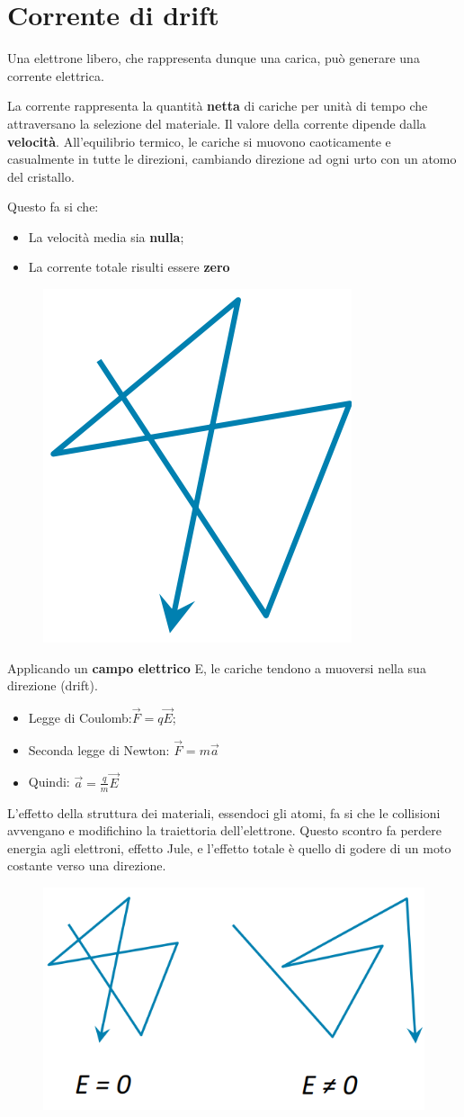 \newpage
\section{Corrente di drift}
Una elettrone libero, che rappresenta dunque una carica, può generare una corrente elettrica.

La corrente rappresenta la quantità \textbf{netta} di cariche per unità di tempo che attraversano la selezione del materiale. Il valore della corrente dipende dalla \textbf{velocità}. All'equilibrio termico, le cariche si muovono caoticamente e casualmente in tutte le direzioni, cambiando direzione ad ogni urto con un atomo del cristallo.

Questo fa si che:
\begin{itemize}
    \item La velocità media sia \textbf{nulla};
    \item La corrente totale risulti essere \textbf{zero}
\end{itemize}

\begin{figure}[htbp]
    \centering
    \includegraphics[width=0.14\linewidth]{img/moto-Casuale.png}    
\end{figure}


Applicando un \textbf{campo elettrico} E, le cariche tendono a muoversi nella sua direzione (drift).

\begin{itemize}
    \item Legge	di	Coulomb:\quad$\vec{F} = q\vec{E}$;
    \item Seconda	legge	di	Newton: \quad $\vec{F} = m\vec{a}$
    \item Quindi: $\vec{a} = \frac{q}{m}\vec{E}$
\end{itemize}

L'effetto della struttura dei materiali, essendoci gli atomi, fa si che le collisioni avvengano e modifichino la traiettoria dell'elettrone. Questo scontro fa perdere energia agli elettroni, effetto Jule, e l'effetto totale è quello di godere di un moto costante verso una direzione.

\begin{figure}[htbp]
    \centering
    \includegraphics[width=0.33\linewidth]{img/campo_elettromagentico.png}  
\end{figure}

